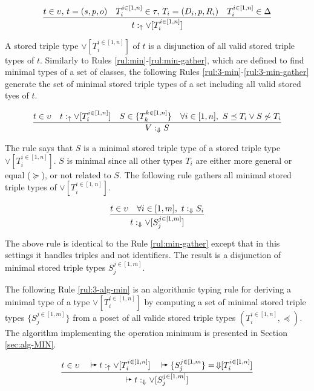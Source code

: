 \documentclass[runningheads]{llncs}
\newcommand{\uarr}{\uparrow}
\newcommand{\Darr}{\Downarrow}
\newcommand{\vdasharr}{%
    \mathrel{%
        \vdash\hspace*{-5pt}%
        \raisebox{2.3pt}{\scalebox{.5}{\(\blacktriangleright\)}}%
    }%
}\newcommand{\D}{{\Delta}}
\begin{document}
\begin{equation}
\label{rul:3-stored2}
\dfrac{t\in\upsilon,\, t=(s,p,o)\quad T_i^{i\in[1,n]}\in\tau,\, T_i=(D_i,p,R_i)\quad\/T_i^{i\in[1,n]}\in\Delta}
      {t:_\uarr\/\lor[T_i^{i\in[1,n]}]}
\end{equation}

A stored triple type $\lor[T_i^{i\in[1,n]}]$ of $t$ is a disjunction
of all valid stored triple types of $t$. Similarly to Rules
\ref{rul:min}-\ref{rul:min-gather}, which are defined to find minimal
types of a set of classes, the following Rules
\ref{rul:3-min}-\ref{rul:3-min-gather} generate the set of minimal
stored triple types of a set including all valid stored tyes of $t$.

\begin{equation}
\label{rul:3-min}
\dfrac{t\in\upsilon\quad\/t:_\uarr\lor[T_i^{i\in[1,n]}]\quad\/S\in\/\{T_k^{k\in[1,n]}\}\quad\forall\/i\in[1,n],\ S\preceq\/T_i\lor\/S\not\sim\/T_i}
      {V:_{\Darr}S}
\end{equation}

The rule says that $S$ is a minimal stored triple type of a stored
triple type $\lor[T_i^{i\in[1,n]}]$. $S$ is minimal since all other
types $T_i$ are either more general or equal ($\succeq$), or not
related to $S$. The following rule gathers all minimal stored triple
types of $\lor[T_i^{i\in[1,n]}]$.

\begin{equation}
\label{rul:3-min-gather}
\dfrac{t\in\upsilon\quad\forall\/i\in[1,m],\ t:_\Darr\/S_i}
      {t:_{\Darr}\lor[S_j^{j\in[1,m]}]}
\end{equation}

The above rule is identical to the Rule \ref{rul:min-gather} except
that in this settings it handles triples and not identifiers. The
result is a disjunction of minimal stored triple types $S_j^{j\in[1,m]}$.

The following Rule \ref{rul:3-alg-min} is an algorithmic typing rule
for deriving a minimal type of a type $\lor[T_i^{i\in[1,n]}]$ by
computing a set of minimal stored triple types $\{S_j^{j\in[1,m]}\}$
from a poset of all valide stored triple types
$(T_i^{i\in[1,n]},\preceq)$. The algorithm implementing the operation
minimum is presented in Section \ref{sec:alg-MIN}.

\begin{equation}
\label{rul:3-alg-min}
\dfrac{t\in\upsilon\quad\vdasharr\/t:_\uarr\lor[T_i^{i\in[1,n]}]\quad\vdasharr\/\{S_j^{j\in[1,m}\}=\,\Darr\kern -3pt[T_i^{i\in[1,n]}]}
{\vdasharr\/t:_{\Darr}\lor\/[S_j^{j\in[1,m]}]}
\end{equation}
\end{document}
